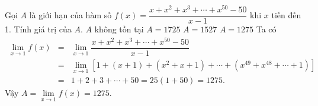 \begin{ex}%
Gọi $A$ là giới hạn của hàm số $f(x)=\dfrac {x+x^2+x^3+\cdots +x^{50}-50}{x-1}$ khi $x$ tiến đến 1. Tính giá trị của $A$.
	\choice
	{$A$ không tồn tại}
	{$A=1725$}
	{$A=1527$}
	{\True $A=1275$}
	\loigiai
	{Ta có \allowdisplaybreaks
		\begin{eqnarray*}
		\lim\limits_{x\to 1} f(x)&=&\lim\limits_{x\to 1} \dfrac {x+x^2+x^3+\cdots +x^{50}-50}{x-1}\\
		&=&\lim\limits_{x\to 1} \left[ 1+(x+1)+\left(x^2+x+1\right)+\cdots +\left(x^{49}+x^{48}+\cdots +1\right) \right]\\
		&=&1+2+3+\cdots +50=25(1+50)=1275.
		\end{eqnarray*}
		Vậy $A=\lim\limits_{x\to 1} f(x)=1275$.}
\end{ex}




